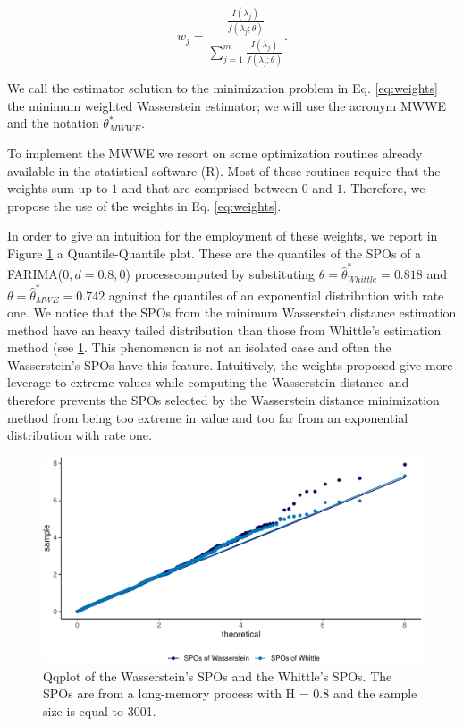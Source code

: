 \documentclass[
  11pt,
]{article}
\begin{document}
\begin{equation}
w_j = \frac{\frac{I(\lambda_j)}{f(\lambda_j; \theta)}}{\sum^m_{j = 1}\frac{I(\lambda_j)}{f(\lambda_j; \theta)}}.
\label{eq:weights}
\end{equation}

We call the estimator solution to the minimization problem in Eq.
\ref{eq:weights} the minimum weighted Wasserstein estimator; we will use
the acronym MWWE and the notation \(\theta^*_{MWWE}\).

To implement the MWWE we resort on some optimization routines already
available in the statistical software (R). Most of these routines
require that the weights sum up to \(1\) and that are comprised between
\(0\) and \(1\). Therefore, we propose the use of the weights in Eq.
\ref{eq:weights}.

In order to give an intuition for the employment of these weights, we
report in Figure \ref{fig:qqplot} a Quantile-Quantile plot. These are
the quantiles of the SPOs of a FARIMA(\(0,d = 0.8,0\)) processcomputed
by substituting \(\theta = \hat \theta^*_{Whittle} = 0.818\) and
\(\theta = \hat \theta^*_{MWE} = 0.742\) against the quantiles of an
exponential distribution with rate one. We notice that the SPOs from the
minimum Wasserstein distance estimation method have an heavy tailed
distribution than those from Whittle's estimation method (see
\ref{fig:qqplot}. This phenomenon is not an isolated case and often the
Wasserstein's SPOs have this feature. Intuitively, the weights proposed
give more leverage to extreme values while computing the Wasserstein
distance and therefore prevents the SPOs selected by the Wasserstein
distance minimization method from being too extreme in value and too far
from an exponential distribution with rate one.

\begin{figure}

{\centering \includegraphics[width=0.6\linewidth]{Master_thesis_V4_files/figure-latex/qqplot-1} 

}

\caption{Qqplot of the Wasserstein's SPOs and the Whittle's SPOs. The SPOs are from a long-memory process with H = 0.8 and the sample size is equal to 3001.}\label{fig:qqplot}
\end{figure}
\end{document}
